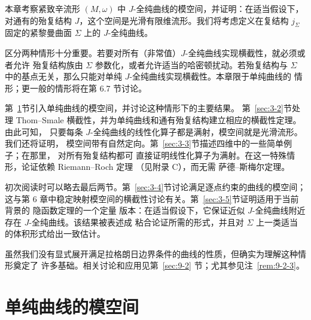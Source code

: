 
本章考察紧致辛流形 $(M,\omega)$ 中 $J$-全纯曲线的模空间，并证明：在适当假设下，
对通有的殆复结构 $J$，这个空间是光滑有限维流形。我们将考虑定义在复结构
$j_\Sigma$ 固定的紧黎曼曲面 $\Sigma$ 上的 $J$-全纯曲线。

区分两种情形十分重要。若要对所有（非常值）$J$-全纯曲线实现横截性，就必须或者允许
殆复结构族由 $\Sigma$ 参数化，或者允许适当的哈密顿扰动。若殆复结构与
$\Sigma$ 中的基点无关，那么只能对单纯 $J$-全纯曲线实现横截性。本章限于单纯曲线的
情形；更一般的情形将在第 6.7 节讨论。

第~\ref{sec:3-1}节引入单纯曲线的模空间，并讨论这种情形下的主要结果。
第~\ref{sec:3-2}节处理
Thom--Smale 横截性，并为单纯曲线和通有殆复结构建立相应的横截性定理。由此可知，
只要每条 $J$-全纯曲线的线性化算子都是满射，模空间就是光滑流形。我们还将证明，
模空间带有自然定向。第~\ref{sec:3-3}节描述四维中的一些简单例子；在那里，
对所有殆复结构都可
直接证明线性化算子为满射。在这一特殊情形，论证依赖 Riemann--Roch 定理
（见附录 C），而无需 萨德--斯梅尔定理。

初次阅读时可以略去最后两节。第~\ref{sec:3-4}节讨论满足逐点约束的曲线的模空间；
这与第 6 章中稳定映射模空间的横截性讨论有关。第~\ref{sec:3-5}节证明适用于当前背景的
隐函数定理的一个定量
版本：在适当假设下，它保证近似 $J$-全纯曲线附近存在 $J$-全纯曲线。该结果被表述成
粘合论证所需的形式，并且对 $\Sigma$ 上一类适当的体积形式给出一致估计。

虽然我们没有显式展开满足拉格朗日边界条件的曲线的性质，但确实为理解这种情形奠定了
许多基础。相关讨论和应用见第~\ref{sec:9-2} 节；尤其参见注~\ref{rem:9-2-3}。

\section{单纯曲线的模空间}\label{sec:3-1}

